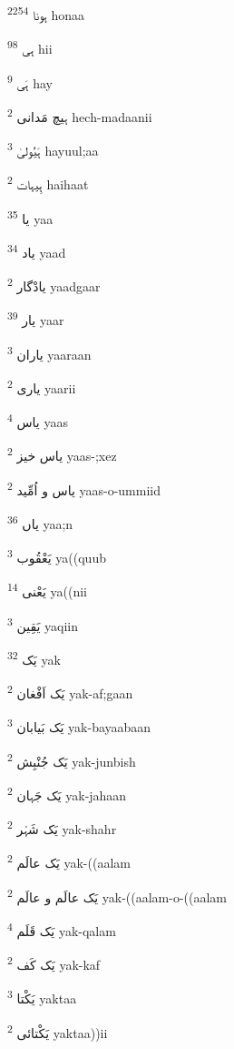 \documentclass[12pt]{article}
\begin{document}
\begin{RTL}
\begin{multicols}{5}
{\ur ہونا}   \textsuperscript{2254} honaa

{\ur ہی}   \textsuperscript{98} hii

{\ur ہَی}   \textsuperscript{9} hay

{\ur ہیچ مَدانی}   \textsuperscript{2} hech-madaanii

{\ur ہَیُولیٰ}   \textsuperscript{3} hayuul;aa

{\ur ہِیہات}   \textsuperscript{2} haihaat

{\ur یا}   \textsuperscript{35} yaa

{\ur یاد}   \textsuperscript{34} yaad

{\ur یادْگار}   \textsuperscript{2} yaadgaar

{\ur یار}   \textsuperscript{39} yaar

{\ur یاران}   \textsuperscript{3} yaaraan

{\ur یاری}   \textsuperscript{2} yaarii

{\ur یاس}   \textsuperscript{4} yaas

{\ur یاس خیز}   \textsuperscript{2} yaas-;xez

{\ur یاس و اُمِّید}   \textsuperscript{2} yaas-o-ummiid

{\ur یاں}   \textsuperscript{36} yaa;n

{\ur یَعْقُوب}   \textsuperscript{3} ya((quub

{\ur یَعْنی}   \textsuperscript{14} ya((nii

{\ur یَقِین}   \textsuperscript{3} yaqiin

{\ur یَک}   \textsuperscript{32} yak

{\ur یَک اَفْغان}   \textsuperscript{2} yak-af;gaan

{\ur یَک بَیابان}   \textsuperscript{3} yak-bayaabaan

{\ur یَک جُنْبِش}   \textsuperscript{2} yak-junbish

{\ur یَک جَہان}   \textsuperscript{2} yak-jahaan

{\ur یَک شَہْر}   \textsuperscript{2} yak-shahr

{\ur یَک عالَم}   \textsuperscript{2} yak-((aalam

{\ur یَک عالَم و عالَم}   \textsuperscript{2} yak-((aalam-o-((aalam

{\ur یَک قَلَم}   \textsuperscript{4} yak-qalam

{\ur یَک کَف}   \textsuperscript{2} yak-kaf

{\ur یَکْتا}   \textsuperscript{3} yaktaa

{\ur یَکْتائی}   \textsuperscript{2} yaktaa))ii


\end{multicols}
\end{RTL}
\end{document}
